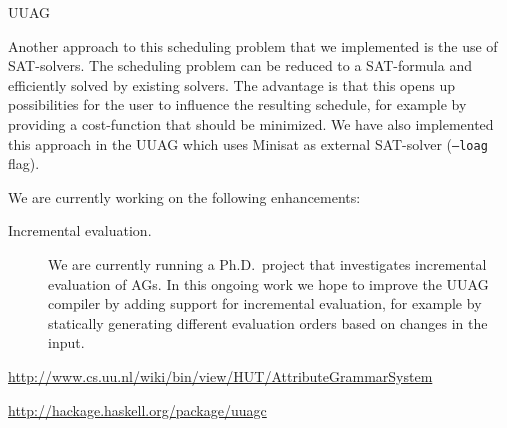 \begin{hcarentry}[updated]{UUAG}
\begin{description}
Another approach to this scheduling problem that we implemented is the use of SAT-solvers.
The scheduling problem can be reduced to a SAT-formula and efficiently solved by existing solvers.
The advantage is that this opens up possibilities for the user to influence the resulting schedule,
for example by providing a cost-function that should be minimized. We have also implemented this
approach in the UUAG which uses Minisat as external SAT-solver (\texttt{--loag} flag).
\end{description}

We are currently working on the following enhancements:
\begin{description}
\item[Incremental evaluation.]
  We are currently running a Ph.D.\ project that investigates incremental evaluation of
  AGs. In this ongoing work we hope to improve the UUAG compiler by adding support for
  incremental evaluation, for example by statically generating different evaluation orders
  based on changes in the input.
\end{description}

\FurtherReading
\begin{compactitem}
\item
  \url{http://www.cs.uu.nl/wiki/bin/view/HUT/AttributeGrammarSystem}
\item
  \url{http://hackage.haskell.org/package/uuagc}
\end{compactitem}
\end{hcarentry}
